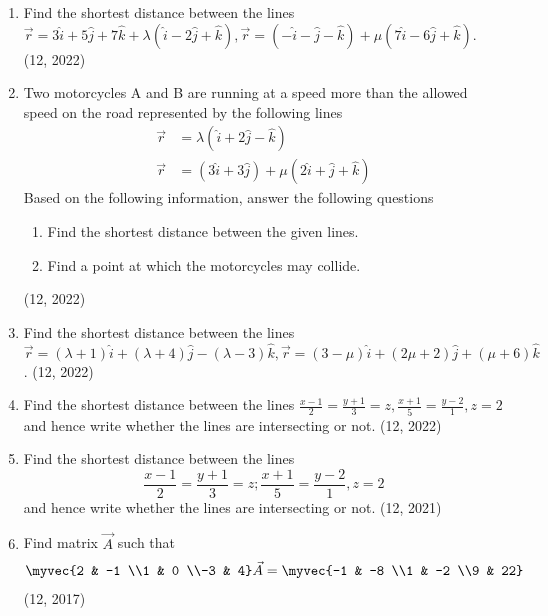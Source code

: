 \begin{enumerate}[label=\thesubsection.\arabic*,ref=\thesubsection.\theenumi]
\item Find the shortest distance between the lines
		$\vec{r}=3\hat{i}+5\hat{j}+7\hat{k}+\lambda(\hat{i}-2\hat{j}+\hat{k}),
		\vec{r}=(-\hat{i}-\hat{j}-\hat{k})+\mu(7\hat{i}-6\hat{j}+\hat{k})$.
\hfill (12, 2022)
\item Two motorcycles A and B are running at a speed more than the allowed speed on the road  represented by the following lines 
	\begin{align*}
		\vec{r}&=\lambda(\hat{i}+2\hat{j}-\hat{k})\\
		\vec{r}&=(3\hat{i}+3\hat{j})+\mu(2\hat{i}+\hat{j}+\hat{k})
	\end{align*}
	Based on the following information, answer the following questions
	\begin{enumerate}
		\item Find the shortest distance between the given lines.
		\item Find a point at which the motorcycles may collide.
	\end{enumerate}
\hfill (12, 2022)

\item Find the shortest distance between the lines
		$\vec{r}=(\lambda+1)\hat{i}+(\lambda+4)\hat{j}-(\lambda-3)\hat{k},
		\vec{r}=(3-\mu)\hat{i}+(2\mu+2)\hat{j}+(\mu+6)\hat{k}$.
\hfill (12, 2022)

\item Find the shortest distance between the lines 
		$\frac{x-1}{2}=\frac{y+1}{3}=z, \frac{x+1}{5}=\frac{y-2}{1}, z=2$
and hence write whether the lines are intersecting or not.
\hfill (12, 2022)
\item Find the shortest distance between the 
lines 
  $$\frac{x-1}{2} = \frac{y+1}{3} = z;
  \frac{x+1}{5} =\frac{y-2}{1},z=2$$
and hence write
whether the lines are intersecting or not.
\hfill (12, 2021)
\item Find matrix $\vec{A}$ such that
\begin{align*}
   \myvec{2 & -1 \\1 & 0 \\-3 & 4} \vec{A}=\myvec{-1 & -8 \\1 & -2 \\9 & 22} 
\end{align*} 
\hfill (12, 2017)

\end{enumerate}
